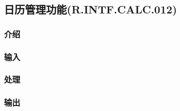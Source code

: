 \subsection{日历管理功能(R.INTF.CALC.012)}
\subsubsection{介绍}
\subsubsection{输入}
\subsubsection{处理}
\subsubsection{输出}